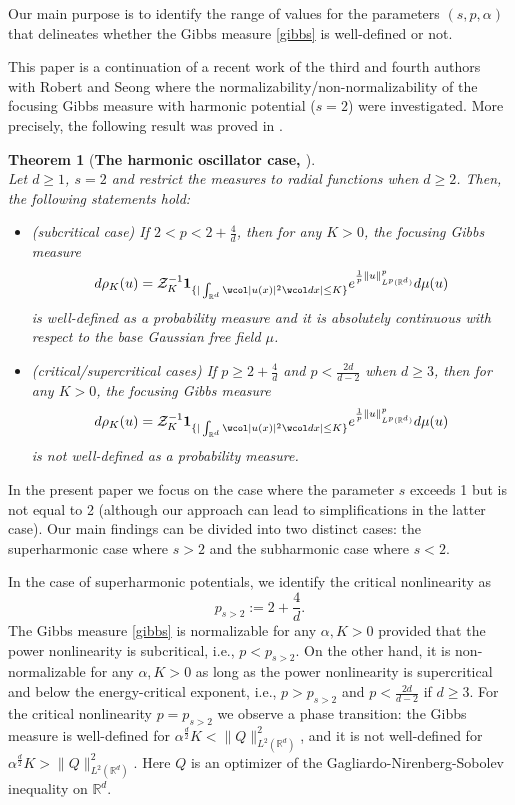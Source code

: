 \documentclass[%
11pt,  reqno]{amsart}
\newtheorem{theorem}{Theorem} [section]
\theoremstyle{remarkstyle}
\newcommand{\1}{\hspace{0.2mm}\text{I}\hspace{0.2mm}}
\newcommand{\noi}{\noindent}
\newcommand{\R}{\mathbb{R}}
\newcommand{\al}{\alpha}
\newcommand{\wick}[1]{\wcol#1\wcol}
\newcommand{\ind}{\mathbf 1}
\numberwithin{equation}{section}
\numberwithin{theorem}{section}
\begin{document}
	Our main purpose is to identify the range of values for the parameters $(s,p,\al)$ that delineates whether the Gibbs measure \eqref{gibbs} is well-defined or not.
	
	This paper is a continuation of a recent work of the third and fourth authors with Robert and Seong \cite{RSTW22} where the normalizability/non-normalizability of the focusing Gibbs measure with harmonic potential ($s=2$) were investigated. More precisely, the following result was proved in \cite{RSTW22}.
	
	\begin{theorem}[\textbf{The harmonic oscillator case, \cite{RSTW22}}] \label{THM:RSTW}\mbox{}\\
		Let $d\geq 1$, $s=2$ and restrict the measures to radial functions when $d\geq 2$. Then, the following statements hold\textup{:}
		
		\smallskip
		
		\noi
		\begin{itemize}
			\item
			[\textup{(i)}] \textup{(subcritical case)} 
			If $2< p< 2+\frac{4}{d}$, then for any $K > 0$, the focusing Gibbs measure
			$$
			d\rho_K(u) = \mathcal Z_K^{-1} \ind_{\{|\int_{\R^d} \wick{|u(x)|^2} dx| \le K\}} e^{ \frac{1}{p}\|u\|^p_{L^p(\R^d)}} d\mu(u)  
			$$
			is well-defined as a probability measure and it is absolutely continuous with respect to the base Gaussian free field $\mu$.
			
			\item
			[\textup{(ii)}] \textup{(critical/supercritical cases)} 
			If $p\ge 2+\frac{4}{d}$ and $p<\frac{2d}{d-2}$ when $d\ge 3$, then for any $K > 0$, the focusing Gibbs measure
			$$
			d\rho_K(u) = \mathcal Z_K^{-1} \ind_{\{|\int_{\R^d} \wick{|u(x)|^2} dx| \le K\}} e^{ \frac{1}{p}\|u\|^p_{L^p(\R^d)}} d\mu(u)  
			$$
			is not well-defined as a probability measure.
		\end{itemize}
	\end{theorem}
	
	In the present paper we focus on the case where the parameter $s$ exceeds 1 but is not equal to 2 (although our approach can lead to simplifications in the latter case). Our main findings can be divided into two distinct cases: the superharmonic case where $s > 2$ and the subharmonic case where $s < 2$. 
	
	In the case of superharmonic potentials, we identify the critical nonlinearity as 
	$$p_{s > 2}:=2+\frac{4}{d}.$$
	The Gibbs measure \eqref{gibbs} is normalizable for any $\al, K>0$ provided that the power nonlinearity is subcritical, i.e., $p<p_{s > 2}$. On the other hand, it is non-normalizable for any $\alpha, K>0$ as long as the power nonlinearity is supercritical and below the energy-critical exponent, i.e., $p > p_{ s> 2}$ and $p<\frac{2d}{d-2}$ if $d\geq 3$. For the critical nonlinearity $p = p_{s> 2}$ we observe a phase transition: the Gibbs measure is well-defined for $\al^{\frac{d}{2}} K <\|Q\|^2_{L^2(\mathbb R^d)}$, and it is not well-defined for $\al^{\frac{d}{2}} K > \|Q\|^2_{L^2(\mathbb R^d)}$. Here $Q$ is an optimizer of the Gagliardo-Nirenberg-Sobolev inequality on $\mathbb R^d$. 
	
\end{document}
